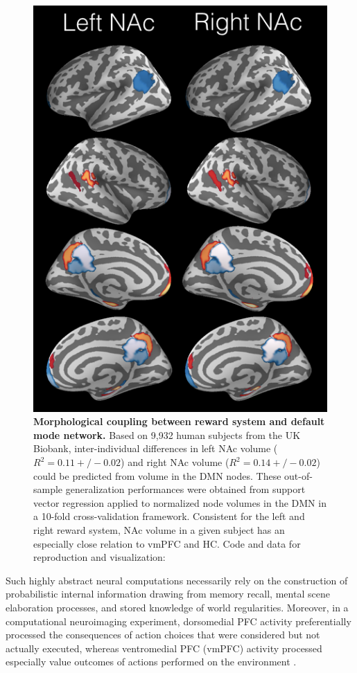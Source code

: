 \documentclass[10pt,letterpaper]{article}
\begin{document}
\begin{figure}
  \includegraphics[width=1.\linewidth]{fig_dmn.png}
  \centering
  \caption{\textbf{Morphological coupling between reward system and
  default mode network.} Based on 9,932 human subjects from the UK Biobank, inter-individual differences in left NAc volume ($R^2=0.11+/-0.02$) and right NAc volume ($R^2=0.14+/-0.02$) could be predicted from volume in the DMN nodes. These out-of-sample generalization performances were obtained from support vector regression applied to normalized node volumes in the DMN in a 10-fold cross-validation framework. Consistent for the left and right reward system, NAc volume in a given subject has an especially close relation to vmPFC and HC.
  Code and data for reproduction and visualization:
  }
  \label{fig:dmn}
\end{figure}
Such highly abstract neural computations necessarily rely on the
construction of probabilistic internal information drawing from
memory recall, mental scene elaboration processes,
and stored knowledge of world regularities.
%
Moreover,
in a computational neuroimaging experiment,
dorsomedial PFC activity preferentially processed the consequences of
action choices that were considered but not actually executed,
whereas ventromedial PFC (vmPFC) activity
processed especially value outcomes of actions performed on the environment
\citep{nicolle2012agent}.
\end{document}
